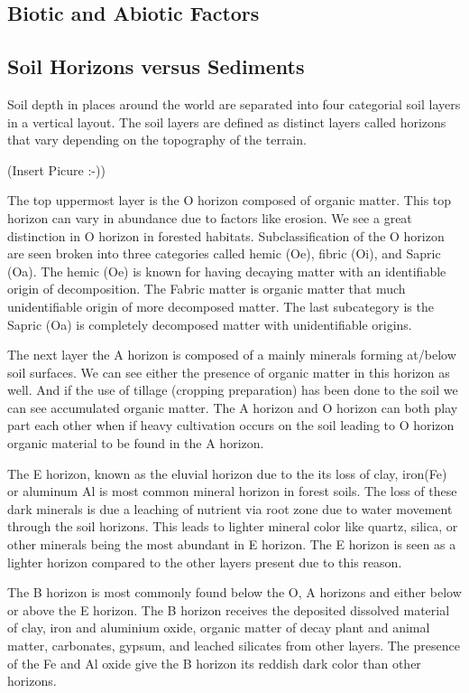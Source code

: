 \subsection{Biotic and Abiotic Factors}





\subsection{Soil Horizons versus Sediments}

Soil depth in places around the world are separated into four categorial soil layers in a vertical layout. The soil layers are defined as distinct layers called horizons that vary depending on the topography of the terrain.

(Insert Picure :-))

The top uppermost layer is the O horizon composed of organic matter. This top horizon can vary in abundance due to factors like erosion.  We see a great distinction in O horizon in forested habitats. Subclassification of the O horizon are seen broken into three categories called hemic (Oe), fibric (Oi), and Sapric (Oa). The hemic (Oe) is known for having decaying matter with an identifiable origin of decomposition. The Fabric matter is organic matter that much unidentifiable origin of more decomposed matter. The last subcategory is the Sapric (Oa) is completely decomposed matter with unidentifiable origins. 

The next layer the A horizon is composed of a mainly minerals forming at/below soil surfaces. We can see either the presence of organic matter in this horizon as well. And if the use of tillage (cropping preparation) has been done to the soil we can see accumulated organic matter. The A horizon and O horizon can both play part each other when if heavy cultivation occurs on the soil leading to O horizon organic material to be found in the A horizon. 

The E horizon, known as the eluvial horizon due to the its loss of clay, iron(Fe) or aluminum Al is most common mineral horizon in forest soils. The loss of these dark minerals is due a leaching of nutrient via root zone due to water movement through the soil horizons. This leads to lighter mineral color like quartz, silica, or other minerals being the most abundant in E horizon. The E horizon is seen as a lighter horizon compared to the other layers present due to this reason.

The B horizon is most commonly found below the O, A horizons and either below or above the E horizon. The B horizon receives the deposited dissolved material of clay, iron and aluminium oxide, organic matter of decay plant and animal matter, carbonates, gypsum, and leached silicates from other layers. The presence of the Fe and Al oxide give the B horizon its reddish dark color than other horizons. 

